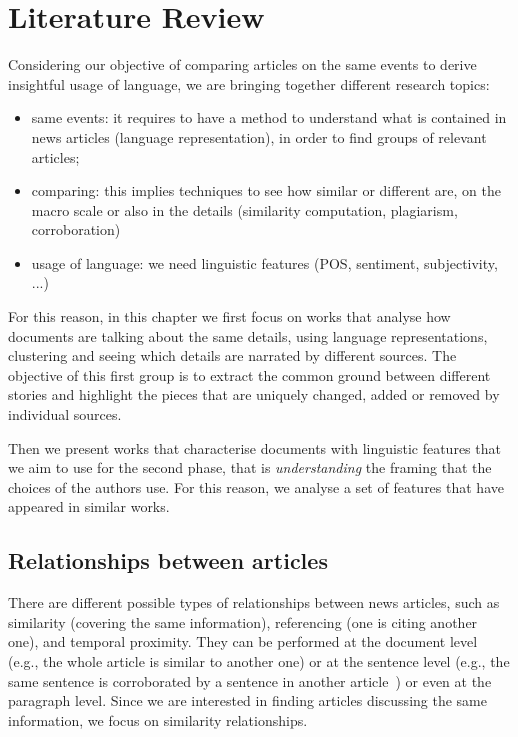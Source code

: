 \chapter{Literature Review}
\label{chap:literature_review}


Considering our objective of comparing articles on the same events to derive insightful usage of language, we are bringing together different research topics:

\begin{itemize}
    \item same events: it requires to have a method to understand what is contained in news articles (language representation), in order to find groups of relevant articles;
    \item comparing: this implies techniques to see how similar or different are, on the macro scale or also in the details (similarity computation, plagiarism, corroboration)
    \item usage of language: we need linguistic features (POS, sentiment, subjectivity, ...)
\end{itemize}

For this reason, in this chapter we first focus on works that analyse how documents are talking about the same details, using language representations, clustering and seeing which details are narrated by different sources.
The objective of this first group is to extract the common ground between different stories and highlight the pieces that are uniquely changed, added or removed by individual sources.

Then we present works that characterise documents with linguistic features that we aim to use for the second phase, that is \emph{understanding} the framing that the choices of the authors use. For this reason, we analyse a set of features that have appeared in similar works.


\section{Relationships between articles}

There are different possible types of relationships between news articles, such as similarity (covering the same information), referencing (one is citing another one), and temporal proximity. They can be performed at the document level (e.g., the whole article is similar to another one) or at the sentence level (e.g., the same sentence is corroborated by a sentence in another article~\cite{bountouridis2018explaining}) or even at the paragraph level.
Since we are interested in finding articles discussing the same information, we focus on similarity relationships.

